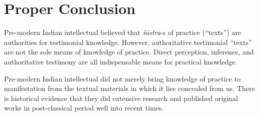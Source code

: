 \section*{Proper Conclusion}

Pre-modern Indian intellectual believed that {\sl śāstra}-s of practice (``texts'') are authorities for testimonial knowledge. However, authoritative testimonial ``texts'' are not the sole means of knowledge of practice. Direct perception, inference, and authoritative testimony are all indispensable means for practical knowledge.

Pre-modern Indian intellectual did not merely bring knowledge of practice to manifestation from the textual materials in which it lies concealed from us. There is historical evidence that they did extensive research and published original works in post-classical period well into recent times.

\newpage

